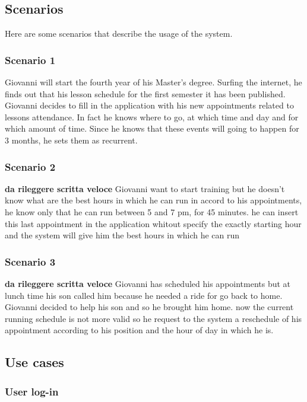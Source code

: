\subsection{Scenarios}

Here are some scenarios that describe the usage of the system.

\subsubsection{Scenario 1} \label{scenario:1}
Giovanni will start the fourth year of his Master's degree. Surfing the internet, he finds out that his lesson schedule for the first semester it has been published. Giovanni decides to fill in the application with his new appointments related to lessons attendance. In fact he knows where to go, at which time and day and for which amount of time. Since he knows that these events will going to happen for 3 months, he sets them as recurrent.

\subsubsection{Scenario 2} \label{scenario:2}
\textbf{da rileggere scritta veloce}
Giovanni want to start training but he doesn't know what are the best hours in which he can run in accord to his appointments, he know only that he can run between 5 and 7 pm, for 45 minutes. he can insert this last appointment in the application whitout specify the exactly starting hour and the system will give him the best hours in which he can run

\subsubsection{Scenario 3} \label{scenario:3}
\textbf{da rileggere scritta veloce}
Giovanni has scheduled his appointments but at lunch time his son called him because he needed a ride for go back to home. Giovanni decided to help his son and so he brought him home. now the current running schedule is not more valid so he request to the system a reschedule of his appointment according to his position and the hour of day in which he is.  

\subsection{Use cases}

\subsubsection{User log-in}

